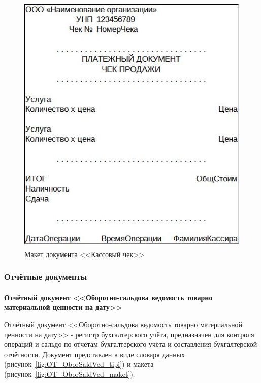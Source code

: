 \documentclass[12pt, a4paper, simple]{eskdtext}
\begin{document}
    \begin{figure}[!h]
        \centering
        \includegraphics[]
            {_docs/ОП_КассЧек_макет.jpg}
        \caption{Макет документа <<Кассовый чек>>}
        \label{fig:OP_KassChek_maket}
    \end{figure}

    \newpage

    \subsubsection{Отчётные документы}

    \paragraph{} \textbf{Отчётный документ <<Оборотно-сальдова ведомость товарно материальной ценности на дату>>}

    Отчётный документ <<Оборотно-сальдова ведомость товарно материальной ценности на дату>>
    - регистр бухгалтерского учёта, предназначен для контроля операций
    и сальдо по отчётам бухгалтерского учёта и составления бухгалтерской отчётности.
    Документ представлен в виде словаря данных (рисунок~\ref{fig:OT_OborSaldVed_tipi})
    и макета (рисунок~\ref{fig:OT_OborSaldVed_maket}).
\end{document}
